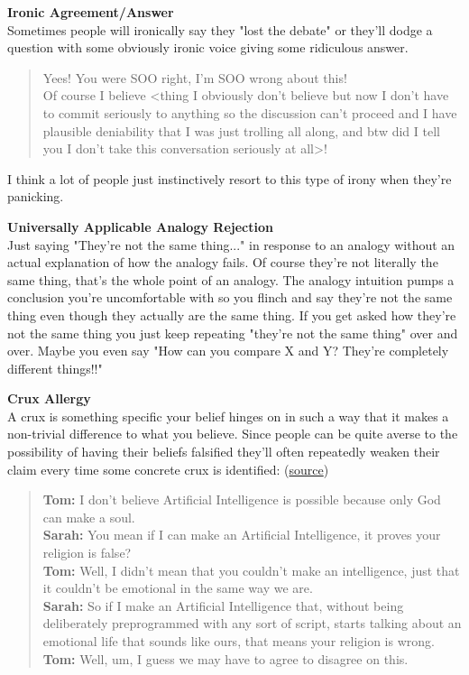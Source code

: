 \par
\textbf{Ironic Agreement/Answer}\\
Sometimes people will ironically say they "lost the debate" or they'll dodge a question with some obviously ironic voice giving some ridiculous answer.\\
\begin{quote}

Yees! You were SOO right, I'm SOO wrong about this!\\ Of course I believe <thing I obviously don't believe but now I don't have to commit seriously to anything so the discussion can't proceed and I have plausible deniability that I was just trolling all along, and btw did I tell you I don't take this conversation seriously at all>!\\
\end{quote}
I think a lot of people just instinctively resort to this type of irony when they're panicking.
\par
\textbf{Universally Applicable Analogy Rejection}\\
Just saying "They're not the same thing..." in response to an analogy without an actual explanation of how the analogy fails. Of course they're not literally the same thing, that's the whole point of an analogy. The analogy intuition pumps a conclusion you're uncomfortable with so you flinch and say they're not the same thing even though they actually are the same thing. If you get asked how they're not the same thing you just keep repeating "they're not the same thing" over and over. Maybe you even say "How can you compare X and Y? They're completely different things!!"
\par
\textbf{Crux Allergy}\\
A crux is something specific your belief hinges on in such a way that it makes a non-trivial difference to what you believe. Since people can be quite averse to the possibility of having their beliefs falsified they'll often repeatedly weaken their claim every time some concrete crux is identified: (\href{https://www.lesswrong.com/posts/NKaPFf98Y5otMbsPk/bayesian-judo}{source})
\begin{quote}
    \textbf{Tom:} I don't believe Artificial Intelligence is possible because only God can make a soul.\\
    \textbf{Sarah:} You mean if I can make an Artificial Intelligence, it proves your religion is false?\\
    \textbf{Tom:} Well, I didn't mean that you couldn't make an intelligence, just that it couldn't be emotional in the same way we are.\\
    \textbf{Sarah:} So if I make an Artificial Intelligence that, without being deliberately preprogrammed with any sort of script, starts talking about an emotional life that sounds like ours, that means your religion is wrong.\\
    \textbf{Tom:} Well, um, I guess we may have to agree to disagree on this.\\
\end{quote}
